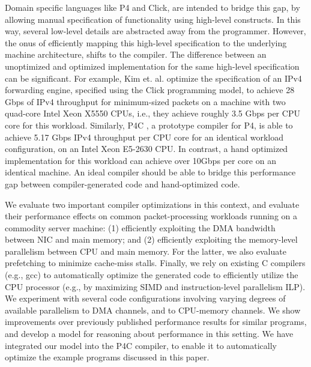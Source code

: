 Domain specific languages like P4\cite{Bosshart:2014:PPP:2656877.2656890} and Click\cite{kohler2000click}, are intended
to bridge this gap, by allowing manual specification of functionality using high-level constructs. In this way, several
low-level details are abstracted away from the programmer. However, the onus of efficiently mapping this high-level
specification to the underlying machine architecture, shifts to the compiler. The difference between an unoptimized
and optimized implementation for the same high-level specification can be significant.
For example, Kim et. al. \cite{Kim:2012:PBC:2349896.2349910} optimize the specification of
an IPv4 forwarding engine, specified using the Click programming model, to achieve 28 Gbps of IPv4 throughput for minimum-sized
packets
on a machine with two quad-core Intel Xeon X5550 CPUs, i.e., they achieve roughly 3.5 Gbps per CPU core for this workload.
Similarly, P4C \cite{Laki:2016:HSP:2934872.2959080}, a prototype compiler for P4,
is able to achieve 5.17 Gbps IPv4 throughput per CPU core for an identical workload configuration, on an Intel Xeon E5-2630
CPU. In contrast, a hand optimized implementation for this workload can achieve over 10Gbps per core on an
identical machine. An ideal compiler should be able to
bridge this performance gap between compiler-generated code and hand-optimized code.

We evaluate two important compiler optimizations in this context, and evaluate their performance
effects on common packet-processing workloads running on a commodity server machine: (1) efficiently exploiting
the DMA bandwidth between NIC and main memory; and (2) efficiently exploiting the memory-level
parallelism between CPU and main memory. For the latter, we also evaluate prefetching to minimize
cache-miss stalls. Finally, we rely on existing C compilers (e.g., gcc) to automatically optimize
the generated code to efficiently utilize the CPU processor (e.g., by maximizing SIMD
and instruction-level parallelism ILP). We experiment with several code configurations involving varying
degrees of available parallelism to DMA channels, and to CPU-memory channels. We show
improvements over previously published performance results for similar programs, and develop a model
for reasoning about performance in this setting. We have integrated our model into the
P4C compiler, to enable it to
automatically optimize the example programs discussed in this paper.


